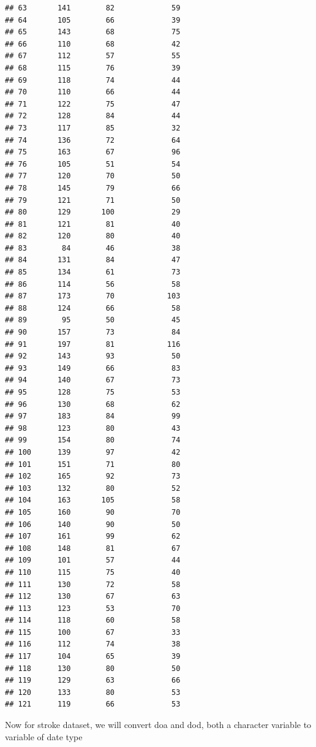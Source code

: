\documentclass[
  10pt,
]{krantz}
\begin{document}
\begin{verbatim}
## 63       141        82             59
## 64       105        66             39
## 65       143        68             75
## 66       110        68             42
## 67       112        57             55
## 68       115        76             39
## 69       118        74             44
## 70       110        66             44
## 71       122        75             47
## 72       128        84             44
## 73       117        85             32
## 74       136        72             64
## 75       163        67             96
## 76       105        51             54
## 77       120        70             50
## 78       145        79             66
## 79       121        71             50
## 80       129       100             29
## 81       121        81             40
## 82       120        80             40
## 83        84        46             38
## 84       131        84             47
## 85       134        61             73
## 86       114        56             58
## 87       173        70            103
## 88       124        66             58
## 89        95        50             45
## 90       157        73             84
## 91       197        81            116
## 92       143        93             50
## 93       149        66             83
## 94       140        67             73
## 95       128        75             53
## 96       130        68             62
## 97       183        84             99
## 98       123        80             43
## 99       154        80             74
## 100      139        97             42
## 101      151        71             80
## 102      165        92             73
## 103      132        80             52
## 104      163       105             58
## 105      160        90             70
## 106      140        90             50
## 107      161        99             62
## 108      148        81             67
## 109      101        57             44
## 110      115        75             40
## 111      130        72             58
## 112      130        67             63
## 113      123        53             70
## 114      118        60             58
## 115      100        67             33
## 116      112        74             38
## 117      104        65             39
## 118      130        80             50
## 119      129        63             66
## 120      133        80             53
## 121      119        66             53
\end{verbatim}

Now for stroke dataset, we will convert doa and dod, both a character variable to variable of date type
\end{document}
